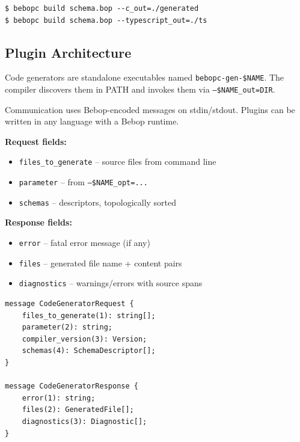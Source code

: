 \documentclass[10pt,onecolumn]{article}
\begin{document}
\begin{lstlisting}[language={}]
$ bebopc build schema.bop --c_out=./generated
$ bebopc build schema.bop --typescript_out=./ts
\end{lstlisting}

\subsection{Plugin Architecture}

Code generators are standalone executables named \texttt{bebopc-gen-\$NAME}. The compiler discovers them in PATH and invokes them via \texttt{--\$NAME\_out=DIR}.

\begin{minipage}{\textwidth}
\begin{minipage}[t]{0.48\textwidth}
\raggedright
Communication uses Bebop-encoded messages on stdin/stdout. Plugins can be written in any language with a Bebop runtime.

\textbf{Request fields:}
\begin{itemize}[leftmargin=1.2em,itemsep=1pt,topsep=2pt]
\item \texttt{files\_to\_generate} -- source files from command line
\item \texttt{parameter} -- from \texttt{--\$NAME\_opt=...}
\item \texttt{schemas} -- descriptors, topologically sorted
\end{itemize}

\textbf{Response fields:}
\begin{itemize}[leftmargin=1.2em,itemsep=1pt,topsep=2pt]
\item \texttt{error} -- fatal error message (if any)
\item \texttt{files} -- generated file name + content pairs
\item \texttt{diagnostics} -- warnings/errors with source spans
\end{itemize}
\end{minipage}\hfill
\begin{minipage}[t]{0.48\textwidth}
\begin{lstlisting}[language=bebop,aboveskip=0pt,belowskip=0pt]
message CodeGeneratorRequest {
    files_to_generate(1): string[];
    parameter(2): string;
    compiler_version(3): Version;
    schemas(4): SchemaDescriptor[];
}

message CodeGeneratorResponse {
    error(1): string;
    files(2): GeneratedFile[];
    diagnostics(3): Diagnostic[];
}
\end{lstlisting}
\end{minipage}
\end{minipage}
\end{document}
